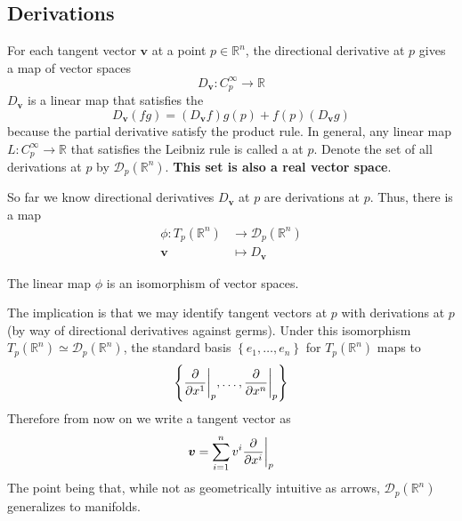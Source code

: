 \subsection{Derivations}

For each tangent vector \(\bm{v}\) at a point \(p \in \mathbb{R}^n\), the directional derivative at \(p\) gives a map of vector spaces
%
\begin{equation*}
    D_{\bm{v}} \colon C_p^\infty \rightarrow \mathbb{R}
\end{equation*}
%
\(D_{\bm{v}}\) is a linear map that satisfies the 
%
\begin{equation}
    D_{\bm{v}}(fg) = (D_{\bm{v}}f)g(p) + f(p) (D_{\bm{v}}g)
\end{equation}
%
because the partial derivative satisfy the product rule.
%
In general, any linear map \(L\colon C_p^\infty \rightarrow \mathbb{R}\) that satisfies the Leibniz rule is called a  at \(p\).
%
Denote the set of all derivations at \(p\) by \(\mathcal{D}_p(\mathbb{R}^n)\).
%
\textbf{This set is also a real vector space}.
%

So far we know directional derivatives \(D_{\bm{v}}\) at \(p\) are derivations at \(p\).
%
Thus, there is a map
\begin{align*}
    \phi\colon T_p(\mathbb{R}^n) & \rightarrow \mathcal{D}_p (\mathbb{R}^n) \\
    \bm{v}                       & \mapsto D_{\bm{v}}
\end{align*}
%
\begin{theorem}{}{}
    The linear map \(\phi\) is an isomorphism of vector spaces.
\end{theorem}
%
\noindent The implication is that we may identify tangent vectors at \(p\) with derivations at \(p\) (by way of directional derivatives against germs).
%
Under this isomorphism \(T_p(\mathbb{R}^n) \simeq \mathcal{D}_p(\mathbb{R}^n)\), the standard basis \(\left\{ e_1, \dots, e_n \right\}\) for \(T_p(\mathbb{R}^n)\) maps to
%
\begin{equation}
    \left\{\evalat[\bigg]{\pdv{}{x^1}}{p}, \dots, \evalat[\bigg]{\pdv{}{x^n}}{p}  \right\}\label{eqn:tangentbasis}
\end{equation}
%
Therefore from now on we write a tangent vector as
%
\begin{equation}
    \bm{v} = \sum_{i=1}^{n} v^i \evalat[\bigg]{\pdv{}{x^i}}{p}
\end{equation}
%
The point being that, while not as geometrically intuitive as arrows, \(\mathcal{D}_p (\mathbb{R}^n)\) generalizes to manifolds.

